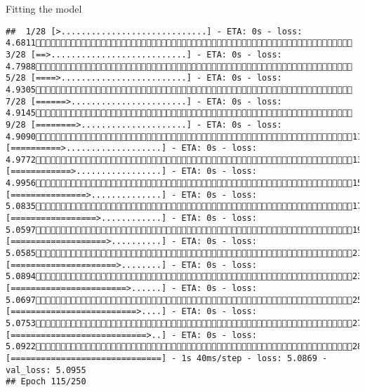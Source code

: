\documentclass[
  ignorenonframetext,
]{beamer}
\begin{document}
\begin{frame}[fragile]{Fitting the model}
\begin{verbatim}
##  1/28 [>.............................] - ETA: 0s - loss: 4.6811 3/28 [==>...........................] - ETA: 0s - loss: 4.7988 5/28 [====>.........................] - ETA: 0s - loss: 4.9305 7/28 [======>.......................] - ETA: 0s - loss: 4.9145 9/28 [========>.....................] - ETA: 0s - loss: 4.909011/28 [==========>...................] - ETA: 0s - loss: 4.977213/28 [============>.................] - ETA: 0s - loss: 4.995615/28 [===============>..............] - ETA: 0s - loss: 5.083517/28 [=================>............] - ETA: 0s - loss: 5.059719/28 [===================>..........] - ETA: 0s - loss: 5.058521/28 [=====================>........] - ETA: 0s - loss: 5.089423/28 [=======================>......] - ETA: 0s - loss: 5.069725/28 [=========================>....] - ETA: 0s - loss: 5.075327/28 [===========================>..] - ETA: 0s - loss: 5.092228/28 [==============================] - 1s 40ms/step - loss: 5.0869 - val_loss: 5.0955
## Epoch 115/250

\end{verbatim}
\end{frame}
\end{document}
